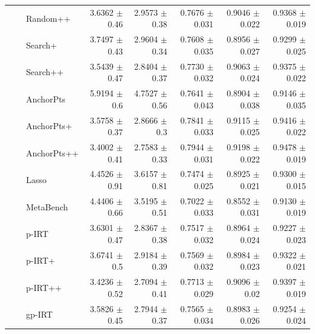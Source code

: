 \begin{longtable}{llp{}rrrrr}
 &  & Random++ & 3.6362 {\scriptsize $\pm$ 0.46} & 2.9573 {\scriptsize $\pm$ 0.38} & 0.7676 {\scriptsize $\pm$ 0.031} & 0.9046 {\scriptsize $\pm$ 0.022} & 0.9368 {\scriptsize $\pm$ 0.019} \\
 &  & Search+ & 3.7497 {\scriptsize $\pm$ 0.43} & 2.9604 {\scriptsize $\pm$ 0.34} & 0.7608 {\scriptsize $\pm$ 0.035} & 0.8956 {\scriptsize $\pm$ 0.027} & 0.9299 {\scriptsize $\pm$ 0.025} \\
 &  & Search++ & 3.5439 {\scriptsize $\pm$ 0.47} & 2.8404 {\scriptsize $\pm$ 0.37} & 0.7730 {\scriptsize $\pm$ 0.032} & 0.9063 {\scriptsize $\pm$ 0.024} & 0.9375 {\scriptsize $\pm$ 0.022} \\
 &  & AnchorPts & 5.9194 {\scriptsize $\pm$ 0.6} & 4.7527 {\scriptsize $\pm$ 0.56} & 0.7641 {\scriptsize $\pm$ 0.043} & 0.8904 {\scriptsize $\pm$ 0.038} & 0.9146 {\scriptsize $\pm$ 0.035} \\
 &  & AnchorPts+ & 3.5758 {\scriptsize $\pm$ 0.37} & 2.8666 {\scriptsize $\pm$ 0.3} & 0.7841 {\scriptsize $\pm$ 0.033} & 0.9115 {\scriptsize $\pm$ 0.025} & 0.9416 {\scriptsize $\pm$ 0.022} \\
 &  & AnchorPts++ & 3.4002 {\scriptsize $\pm$ 0.41} & 2.7583 {\scriptsize $\pm$ 0.33} & 0.7944 {\scriptsize $\pm$ 0.031} & 0.9198 {\scriptsize $\pm$ 0.022} & 0.9478 {\scriptsize $\pm$ 0.019} \\
 &  & Lasso & 4.4526 {\scriptsize $\pm$ 0.91} & 3.6157 {\scriptsize $\pm$ 0.81} & 0.7474 {\scriptsize $\pm$ 0.025} & 0.8925 {\scriptsize $\pm$ 0.021} & 0.9300 {\scriptsize $\pm$ 0.015} \\
 &  & MetaBench & 4.4406 {\scriptsize $\pm$ 0.66} & 3.5195 {\scriptsize $\pm$ 0.51} & 0.7022 {\scriptsize $\pm$ 0.033} & 0.8552 {\scriptsize $\pm$ 0.031} & 0.9130 {\scriptsize $\pm$ 0.019} \\
 &  & p-IRT & 3.6301 {\scriptsize $\pm$ 0.47} & 2.8367 {\scriptsize $\pm$ 0.38} & 0.7517 {\scriptsize $\pm$ 0.032} & 0.8964 {\scriptsize $\pm$ 0.024} & 0.9227 {\scriptsize $\pm$ 0.023} \\
 &  & p-IRT+ & 3.6741 {\scriptsize $\pm$ 0.5} & 2.9184 {\scriptsize $\pm$ 0.39} & 0.7569 {\scriptsize $\pm$ 0.032} & 0.8984 {\scriptsize $\pm$ 0.023} & 0.9322 {\scriptsize $\pm$ 0.021} \\
 &  & p-IRT++ & 3.4236 {\scriptsize $\pm$ 0.52} & 2.7094 {\scriptsize $\pm$ 0.41} & 0.7713 {\scriptsize $\pm$ 0.029} & 0.9096 {\scriptsize $\pm$ 0.02} & 0.9397 {\scriptsize $\pm$ 0.019} \\
 &  & gp-IRT & 3.5826 {\scriptsize $\pm$ 0.45} & 2.7944 {\scriptsize $\pm$ 0.37} & 0.7565 {\scriptsize $\pm$ 0.034} & 0.8983 {\scriptsize $\pm$ 0.026} & 0.9254 {\scriptsize $\pm$ 0.024} \\

\end{longtable}

